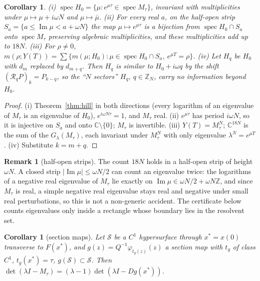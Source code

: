 \documentclass[11pt]{article}
\newtheorem{corollary}[lemma]{Corollary}
\theoremstyle{definition}
\newtheorem{remark}[lemma]{Remark}
\newcommand{\C}{\mathbb{C}}
\newcommand{\Z}{\mathbb{Z}}
\newcommand{\im}{\operatorname{Im}}
\newcommand{\spec}{\operatorname{spec}}
\begin{document}
\begin{corollary}\label{cor:strip}
(i) $\spec H_0 = \{\mu : e^{\mu\tau} \in \spec M_\tau\}$, invariant with multiplicities under $\mu \mapsto \mu + i\omega N$ and $\mu \mapsto \bar\mu$.
(ii) For every real $a$, on the half-open strip $S_a = \{a \le \im\mu < a + \omega N\}$ the map $\mu \mapsto e^{\mu\tau}$ is a bijection from $\spec H_0 \cap S_a$ onto $\spec M_\tau$ preserving algebraic multiplicities, and these multiplicities add up to $18N$.
(iii) For $\rho \ne 0$, $m(\rho; Y(T)) = \sum\{m(\mu; H_0) : \mu \in \spec H_0 \cap S_a,\ e^{\mu T} = \rho\}$.
(iv) Let $H_q$ be $H_0$ with $d_m$ replaced by $d_{m+q}$. Then $H_q$ is similar to $H_0 + i\omega q$ by the shift $(\mathcal R_qP)_k = P_{k-q}$, so the ``$N$ sectors'' $H_q$, $q \in \Z_N$, carry no information beyond $H_0$.
\end{corollary}

\begin{proof}
(i) Theorem~\ref{thm:hill} in both directions (every logarithm of an eigenvalue of $M_\tau$ is an eigenvalue of $H_0$), $e^{i\omega N\tau} = 1$, and $M_\tau$ real. (ii) $e^{\mu\tau}$ has period $i\omega N$, so it is injective on $S_a$ and onto $\C\setminus\{0\}$; $M_\tau$ is invertible. (iii) $Y(T) = M_\tau^N$; $\C^{18N}$ is the sum of the $G_\lambda(M_\tau)$, each invariant under $M_\tau^N$ with only eigenvalue $\lambda^N = e^{\mu T}$. (iv) Substitute $k = m + q$.
\end{proof}

\begin{remark}[half-open strips]\label{rem:halfopen}
The count $18N$ holds in a half-open strip of height $\omega N$. A closed strip $|\im\mu| \le \omega N/2$ can count an eigenvalue twice: the logarithms of a negative real eigenvalue of $M_\tau$ lie exactly on $\im\mu \in \omega N/2 + \omega N\Z$, and since $M_\tau$ is real, a simple negative real eigenvalue stays real and negative under small real perturbations, so this is not a non-generic accident. The certificate below counts eigenvalues only inside a rectangle whose boundary lies in the resolvent set.
\end{remark}

\begin{corollary}[section maps]\label{cor:section}
Let $\mathcal S$ be a $C^1$ hypersurface through $x^* = x(0)$ transverse to $F(x^*)$, and $g(z) = Q^{-1}\varphi_{t_g(z)}(z)$ a section map with $t_g$ of class $C^1$, $t_g(x^*) = \tau$, $g(\mathcal S) \subset \mathcal S$. Then $\det(\lambda I - M_\tau) = (\lambda - 1)\det(\lambda I - Dg(x^*))$.
\end{corollary}
\end{document}
